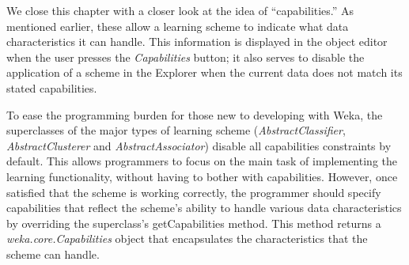 We close this chapter with a closer look at the idea of
``capabilities.'' As mentioned earlier, these allow a learning scheme to
indicate what data characteristics it can handle. This information is
displayed in the object editor when the user presses the \textit{Capabilities}
button; it also serves to disable the application of a scheme in the
Explorer when the current data does not match its stated capabilities.

To ease the programming burden for those new to developing with Weka,
the superclasses of the major types of learning scheme (\textit{AbstractClassifier},
\textit{AbstractClusterer} and \textit{AbstractAssociator}) disable all capabilities
constraints by default. This allows programmers to focus on the main
task of implementing the learning functionality, without having to
bother with capabilities. However, once satisfied that the scheme is
working correctly, the programmer should specify capabilities that
reflect the scheme's ability to handle various data characteristics by
overriding the superclass's getCapabilities method. This method
returns a \textit{weka.core.Capabilities} object that encapsulates the
characteristics that the scheme can handle.

